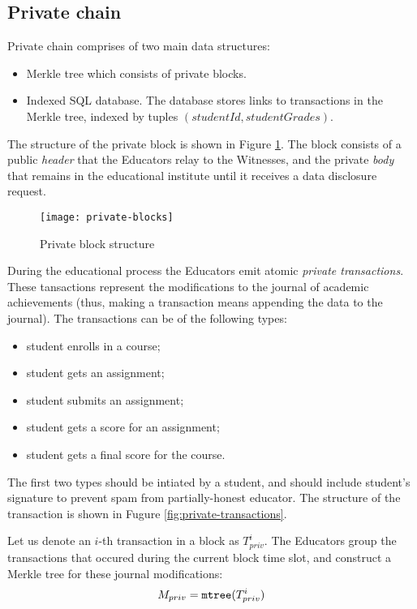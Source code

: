 \subsection{Private chain}

Private chain comprises of two main data structures:
\begin{itemize}
\item Merkle tree which consists of private blocks.
\item Indexed SQL database. The database stores links to transactions in the Merkle tree, indexed by tuples $(studentId, studentGrades)$.
\end{itemize}

The structure of the private block is shown in Figure \ref{fig:privateblocks}. The block consists of a public \textit{header} that the Educators relay to the Witnesses, and the private \textit{body} that remains in the educational institute until it receives a data disclosure request.

\begin{figure}[ht]
\centering
\texttt{[image: private-blocks]}
\caption{Private block structure}
\label{fig:privateblocks}
\end{figure}

During the educational process the Educators emit atomic \textit{private transactions}. These tansactions represent the modifications to the journal of academic achievements (thus, making a transaction means appending the data to the journal). The transactions can be of the following types:
\begin{itemize}
\item student enrolls in a course;
\item student gets an assignment;
\item student submits an assignment;
\item student gets a score for an assignment;
\item student gets a final score for the course.
\end{itemize}

The first two types should be intiated by a student, and should include student's signature to prevent spam from partially-honest educator.
The structure of the transaction is shown in Fugure \ref{fig:private-transactions}.

Let us denote an $i$-th transaction in a block as $T_{priv}^i$. The Educators group the transactions that occured during the current block time slot, and construct a Merkle tree \cite{merkle1989certified} for these journal modifications:
\begin{equation}
M_{priv} = \mathtt{mtree}(T_{priv}^i)
\end{equation}

